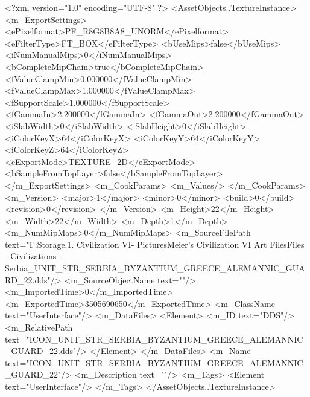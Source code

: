 <?xml version="1.0" encoding="UTF-8" ?>
<AssetObjects..TextureInstance>
	<m_ExportSettings>
		<ePixelformat>PF_R8G8B8A8_UNORM</ePixelformat>
		<eFilterType>FT_BOX</eFilterType>
		<bUseMips>false</bUseMips>
		<iNumManualMips>0</iNumManualMips>
		<bCompleteMipChain>true</bCompleteMipChain>
		<fValueClampMin>0.000000</fValueClampMin>
		<fValueClampMax>1.000000</fValueClampMax>
		<fSupportScale>1.000000</fSupportScale>
		<fGammaIn>2.200000</fGammaIn>
		<fGammaOut>2.200000</fGammaOut>
		<iSlabWidth>0</iSlabWidth>
		<iSlabHeight>0</iSlabHeight>
		<iColorKeyX>64</iColorKeyX>
		<iColorKeyY>64</iColorKeyY>
		<iColorKeyZ>64</iColorKeyZ>
		<eExportMode>TEXTURE_2D</eExportMode>
		<bSampleFromTopLayer>false</bSampleFromTopLayer>
	</m_ExportSettings>
	<m_CookParams>
		<m_Values/>
	</m_CookParams>
	<m_Version>
		<major>1</major>
		<minor>0</minor>
		<build>0</build>
		<revision>0</revision>
	</m_Version>
	<m_Height>22</m_Height>
	<m_Width>22</m_Width>
	<m_Depth>1</m_Depth>
	<m_NumMipMaps>0</m_NumMipMaps>
	<m_SourceFilePath text="F:\Mod Storage\2.1. Civilization VI\Mods\Archive - Pictures\Sid Meier's Civilization VI Art Files\Art Files - Civilizations\Civilization - Serbia\ICON_UNIT_STR_SERBIA_BYZANTIUM_GREECE_ALEMANNIC_GUARD_22.dds"/>
	<m_SourceObjectName text=""/>
	<m_ImportedTime>0</m_ImportedTime>
	<m_ExportedTime>3505690650</m_ExportedTime>
	<m_ClassName text="UserInterface"/>
	<m_DataFiles>
		<Element>
			<m_ID text="DDS"/>
			<m_RelativePath text="ICON_UNIT_STR_SERBIA_BYZANTIUM_GREECE_ALEMANNIC_GUARD_22.dds"/>
		</Element>
	</m_DataFiles>
	<m_Name text="ICON_UNIT_STR_SERBIA_BYZANTIUM_GREECE_ALEMANNIC_GUARD_22"/>
	<m_Description text=""/>
	<m_Tags>
		<Element text="UserInterface"/>
	</m_Tags>
</AssetObjects..TextureInstance>

